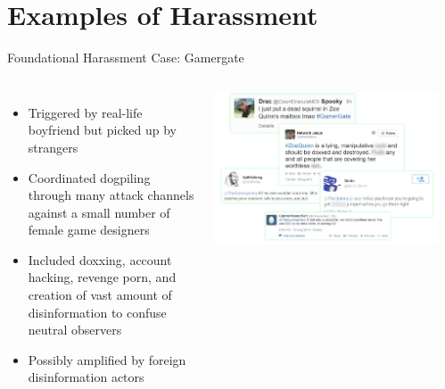 \documentclass[nobackground,dvipsnames,table]{beamer}
\begin{document}
\section{Examples of Harassment}

\begin{frame}{Foundational Harassment Case: Gamergate}
    \begin{columns}
            \begin{itemize}
                \item Triggered by real-life boyfriend but picked up by strangers
                \item Coordinated dogpiling through many attack channels against a small number of female game designers
                \item Included doxxing, account hacking, revenge porn, and creation of vast amount of disinformation to confuse neutral observers
                \item Possibly amplified by foreign disinformation actors
            \end{itemize}
            \includegraphics[width=\textwidth]{zoe-quinn-harassment-tweets}
            \begin{columns}

\end{columns}
\end{columns}
\end{frame}
\end{document}
